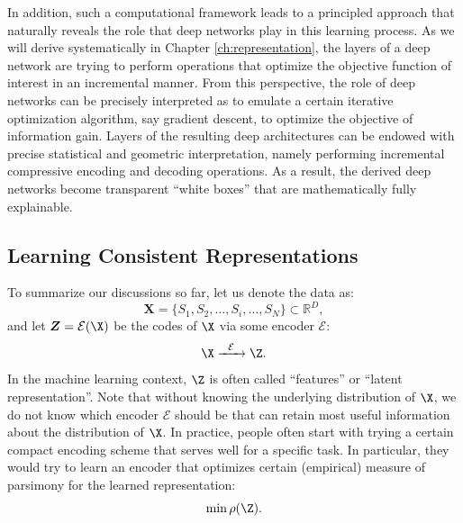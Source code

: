 \documentclass[../../book-main.tex]{subfiles}
\begin{document}
In addition, such a computational framework leads to a principled approach that naturally reveals the role that deep networks play in this learning process. As we will derive systematically in Chapter \ref{ch:representation}, the layers of a deep network are trying to perform operations that optimize the objective function of interest in an incremental manner. From this perspective, the role of deep networks can be precisely interpreted as to emulate a certain iterative optimization algorithm, say gradient descent, to optimize the objective of information gain. Layers of the resulting deep architectures can be endowed with precise statistical and geometric interpretation, namely performing incremental compressive encoding and decoding operations. As a result, the derived deep networks become transparent ``white boxes'' that are mathematically fully explainable.  











\subsection{Learning Consistent Representations}

\label{sec:consistency}
To summarize our discussions so far, let us denote the data as:
\begin{equation}
    \boldsymbol{X} = \{S_1, S_2, \ldots, S_i, \ldots, S_N\} \subset \mathbb{R}^D,
\end{equation}
and let $\boldsymbol{Z} = \mathcal{E}(\X)$ be the codes of $\X$ via some encoder $\mathcal{E}$:
\begin{equation}
    \X  \xrightarrow{\hspace{2mm} \mathcal{E}\hspace{2mm}} \Z.
    \label{eqn:open-loop}
\end{equation}
In the machine learning context, $\Z$ is often called ``features'' or ``latent representation''. Note that without knowing the underlying distribution of $\X$, we do not know which encoder $\mathcal{E}$ should be that can retain most useful information about the distribution of $\X$. In practice, people often start with trying a certain compact encoding scheme that serves well for a specific task. In particular, they would try to learn an encoder that optimizes certain (empirical) measure of parsimony for the learned representation:
\begin{equation}
    \min \rho(\Z). 
\end{equation}
\end{document}
